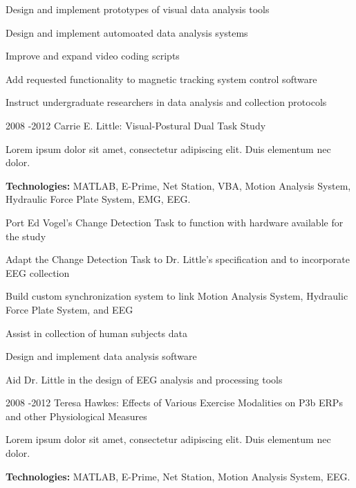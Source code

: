 \documentclass[10pt]{article} %
\begin{document}
\begin{itemize-noindent}
\begin{itemize-noindent}
\item{Design and implement prototypes of visual data analysis tools}
\item{Design and implement automoated data analysis systems}
\item{Improve and expand video coding scripts}
\item{Add requested functionality to magnetic tracking system control software}
\item{Instruct undergraduate researchers in data analysis and collection protocols}
\end{itemize-noindent}


\job
{2008 -}{2012}
{Carrie E. Little: Visual-Postural Dual Task Study}
{Lorem ipsum dolor sit amet, consectetur adipiscing elit. Duis elementum nec dolor. \\
\rule{0mm}{5mm}\textbf{Technologies:} MATLAB, E-Prime, Net Station, VBA, Motion Analysis System, Hydraulic Force Plate System, EMG, EEG.}

\begin{itemize-noindent}
\item{Port Ed Vogel's Change Detection Task to function with hardware available for the study}
\item{Adapt the Change Detection Task to Dr. Little's specification and to incorporate EEG collection}
\item{Build custom synchronization system to link Motion Analysis System, Hydraulic Force Plate System, and EEG}
\item{Assist in collection of human subjects data}
\item{Design and implement data analysis software}
\item{Aid Dr. Little in the design of EEG analysis and processing tools}
\end{itemize-noindent}


\job
{2008 -}{2012}
{Teresa Hawkes: Effects of Various Exercise Modalities on P3b ERPs and other Physiological Measures}
{Lorem ipsum dolor sit amet, consectetur adipiscing elit. Duis elementum nec dolor. \\
\rule{0mm}{5mm}\textbf{Technologies:} MATLAB, E-Prime, Net Station, Motion Analysis System, EEG.}


\end{itemize-noindent}
\end{document}
